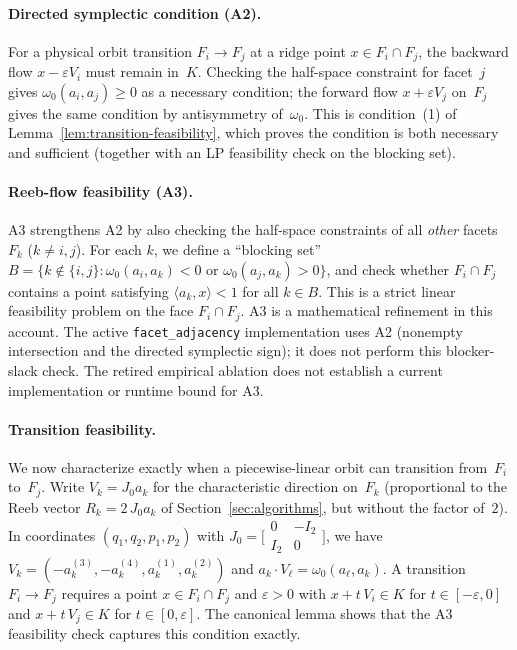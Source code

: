 \paragraph{Directed symplectic condition (A2).}
For a physical orbit transition $F_i \to F_j$ at a ridge point $x \in F_i \cap F_j$,
the backward flow $x - \varepsilon V_i$ must remain in~$K$.
Checking the half-space constraint for facet~$j$ gives
$\omega_0(a_i, a_j) \ge 0$ as a necessary condition;
the forward flow $x + \varepsilon V_j$ on~$F_j$ gives the same condition
by antisymmetry of~$\omega_0$.
This is condition~(1) of Lemma~\ref{lem:transition-feasibility},
which proves the condition is both necessary and sufficient
(together with an LP feasibility check on the blocking set).

\paragraph{Reeb-flow feasibility (A3).}
A3 strengthens A2 by also checking the half-space constraints of all \emph{other}
facets $F_k$ ($k \neq i, j$).
For each $k$, we define a ``blocking set''
$B = \{k \notin \{i,j\} : \omega_0(a_i, a_k) < 0 \text{ or } \omega_0(a_j, a_k) > 0\}$,
and check whether $F_i \cap F_j$ contains a point satisfying
$\langle a_k, x \rangle < 1$ for all $k \in B$.
This is a strict linear feasibility problem on the face $F_i \cap F_j$.
A3 is a mathematical refinement in this account.  The active
\texttt{facet\_adjacency} implementation uses A2 (nonempty intersection
and the directed symplectic sign); it does not perform this blocker-slack
check.  The retired empirical ablation does not establish a current
implementation or runtime bound for A3.

\paragraph{Transition feasibility.}
We now characterize exactly when a piecewise-linear orbit can
transition from~$F_i$ to~$F_j$.
Write $V_k = J_0 a_k$ for the characteristic direction on~$F_k$
(proportional to the Reeb vector $R_k = 2\, J_0 a_k$
of Section~\ref{sec:algorithms}, but without the factor of~$2$).
In coordinates $(q_1, q_2, p_1, p_2)$ with
$J_0 = \bigl[\begin{smallmatrix} 0 & -I_2 \\ I_2 & 0 \end{smallmatrix}\bigr]$,
we have $V_k = (-a_k^{(3)}, -a_k^{(4)}, a_k^{(1)}, a_k^{(2)})$
and $a_k \cdot V_\ell = \omega_0(a_\ell, a_k)$.
A transition $F_i \to F_j$ requires a point $x \in F_i \cap F_j$
and $\varepsilon > 0$ with
$x + t\, V_i \in K$ for $t \in [-\varepsilon, 0]$
and $x + t\, V_j \in K$ for $t \in [0, \varepsilon]$.
The canonical lemma shows that the A3 feasibility check
captures this condition exactly.

